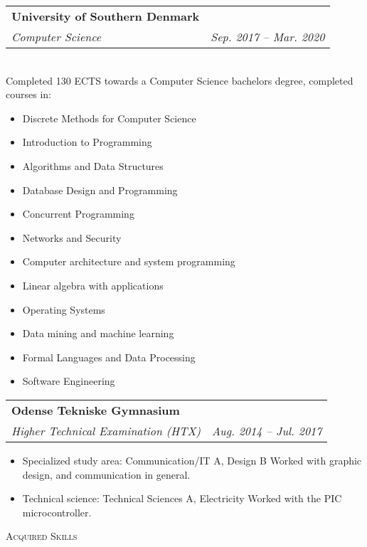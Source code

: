 \documentclass[11pt]{article}
\makeatletter
\newcommand{\resumeSubheading}[4]{
  \noindent\begin{tabular*}{0.98\textwidth}[t]{l@{\extracolsep{\fill}}r}
    \textbf{#1} & #2 \\ \vspace{-3pt} 
    \textit{\small#3} & \textit{\small #4} 
  \end{tabular*}\vspace{7pt}
}
\makeatother
\begin{document}
\resumeSubheading{University of Southern Denmark}{}{Computer Science}{Sep. 2017
-- Mar. 2020}\\\vspace{0.25cm} 
{\indent\small Completed 130 ECTS towards a Computer Science bachelors degree,
completed courses in:}
  \vspace{-0.3cm}
  {\footnotesize 
  \begin{itemize}
  \setlength{\itemsep}{-1pt}
    \item Discrete Methods for Computer Science
    \item Introduction to Programming
    \item Algorithms and Data Structures
    \item Database Design and Programming
    \item Concurrent Programming
    \item Networks and Security
    \item Computer architecture and system programming
    \item Linear algebra with applications
    \item Operating Systems
    \item Data mining and machine learning
    \item Formal Languages and Data Processing
    \item Software Engineering
\end{itemize}}
\vspace{0.3cm}

\resumeSubheading{Odense Tekniske Gymnasium}{}{Higher Technical
Examination (HTX)}{Aug. 2014 -- Jul. 2017}
{\small \begin{itemize}\vspace{-0.25cm}
  \setlength{\itemsep}{-1pt}
  \item Specialized study area: Communication/IT A, Design B
    \subitem Worked with graphic design, and communication in general.
  \item Technical science: Technical Sciences A, Electricity
    \subitem\footnotesize Worked with the PIC microcontroller.
\end{itemize}
} \vspace{0.5cm}

\noindent\large{\scshape{Acquired Skills}} \newline
\noindent{\rule[0.3cm]{\textwidth}{0.4pt}}
\end{document}
